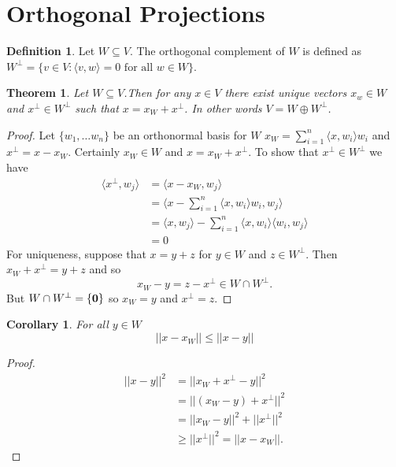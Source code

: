 \documentclass[oneside, 12pt]{book}
\newtheorem{thm}{Theorem}[section]
\newtheorem{cor}{Corollary}[section]
\theoremstyle{definition}
\newtheorem{defn}{Definition}[section]
\begin{document}
\section{Orthogonal Projections}
\begin{defn}
\label{orthcomp}
Let $W \subseteq V$. The orthogonal complement of $W$ is defined as $W^{\perp}=\{v \in V : \langle v, w \rangle=0 \text{ for all } w \in W\}$.
\end{defn}

\begin{thm}
\label{thm_orthodecomp}
  Let $W \subseteq V$.Then for any $x \in V$ there exist unique vectors $x_{w} \in W$ and $x^{\perp} \in W^{\perp}$ such that $x=x_{W}+x^{\perp}$. In other words $V=W \oplus W^{\perp}$.
\end{thm}
\begin{proof}
  Let $\{w_{1}, \dots w_{n}\}$ be an orthonormal basis for $W$ $x_{W}=\sum_{i=1}^{n}\langle x, w_{i} \rangle w_{i}$ and $x^{\perp}=x-x_{W}$. Certainly $x_{W} \in W$ and $x=x_{W}+x^{\perp}$. To show that $x^{\perp} \in W^{\perp}$ we have
  \begin{align}
    \langle x^{\perp},w_{j}\rangle &= \langle x-x_{W}, w_{j} \rangle \\
                   &= \langle x- \sum_{i=1}^{n} \langle x, w_{i} \rangle w_{i}, w_{j} \rangle \\
                   &= \langle x, w_{j} \rangle - \sum_{i=1}^{n}\langle x, w_{i} \rangle \langle w_{i}, w_{j} \rangle \\
    &= 0
  \end{align}
  For uniqueness, suppose that $x=y+z$ for $y \in W$ and $z \in W^{\perp}$. Then $x_{W}+x^{\perp}=y+z$ and so \[x_{W}-y=z-x^{\perp} \in W \cap W^{\perp}.\]
  But $W \cap W^{\perp}=\{\bold{0}\}$ so $x_{W}=y$ and $x^{\perp}=z$.
\end{proof}
\begin{cor}
  \label{cor_min}
For all $y \in W$ \[||x-x_{W}||\leq ||x-y||\]
\end{cor}
\begin{proof}
\begin{align}
  ||x-y||^{2} &= ||x_{W}+x^{\perp}-y||^{2} \\
              &=||(x_{W}-y)+x^{\perp}||^{2} \\
              &= ||x_{W}-y||^{2}+||x^{\perp}||^{2} \\
              &\geq ||x^{\perp}||^{2} = ||x-x_{W}||.
\end{align}
\end{proof}
\end{document}

